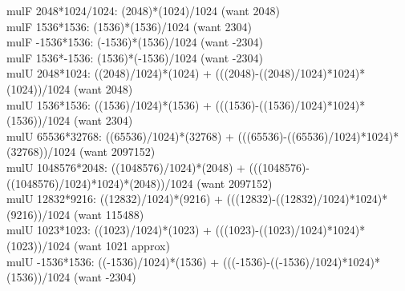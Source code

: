 \documentclass{article}
\def\mulF#1#2{\the\numexpr (#1)*(#2)/1024\relax}
\def\mulU#1#2{\the\numexpr ((#1)/1024)*(#2) + (((#1)-((#1)/1024)*1024)*(#2))/1024\relax}
\begin{document}
\ttfamily\small\raggedright
mulF 2048*1024/1024: \mulF{2048}{1024} (want 2048)\\
mulF 1536*1536: \mulF{1536}{1536} (want 2304)\\
mulF -1536*1536: \mulF{-1536}{1536} (want -2304)\\
mulF 1536*-1536: \mulF{1536}{-1536} (want -2304)\\[1ex]
mulU 2048*1024: \mulU{2048}{1024} (want 2048)\\
mulU 1536*1536: \mulU{1536}{1536} (want 2304)\\
mulU 65536*32768: \mulU{65536}{32768} (want 2097152)\\
mulU 1048576*2048: \mulU{1048576}{2048} (want 2097152)\\
mulU 12832*9216: \mulU{12832}{9216} (want 115488)\\
mulU 1023*1023: \mulU{1023}{1023} (want 1021 approx)\\
mulU -1536*1536: \mulU{-1536}{1536} (want -2304)\\
\end{document}
